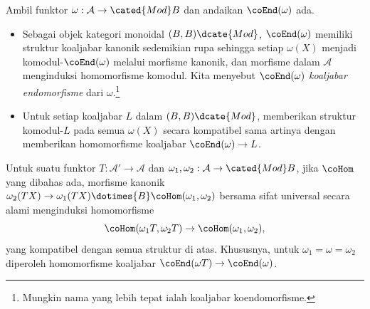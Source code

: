 \begin{definition-proposition}\label{def:cogebra-L}
	Ambil funktor $\omega:\mathcal{A}\to\cated{Mod}B$ dan andaikan
	$\coEnd(\omega)$ ada.
	\begin{itemize}
		\item Sebagai objek kategori monoidal $(B,B)\dcate{Mod}$,
		$\coEnd(\omega)$ memiliki struktur koaljabar kanonik sedemikian rupa
		sehingga setiap $\omega(X)$ menjadi komodul-$\coEnd(\omega)$ melalui
		morfisme kanonik, dan morfisme dalam $\mathcal{A}$ menginduksi
		homomorfisme komodul. Kita menyebut $\coEnd(\omega)$
		\emph{koaljabar endomorfisme} dari $\omega$.\footnote{Mungkin nama
		yang lebih tepat ialah koaljabar koendomorfisme.}
		\item Untuk setiap koaljabar $L$ dalam $(B,B)\dcate{Mod}$,
		memberikan struktur komodul-$L$ pada semua $\omega(X)$ secara
		kompatibel sama artinya dengan memberikan homomorfisme koaljabar
		$\coEnd(\omega)\to L$.
	\end{itemize}
\end{definition-proposition}

\begin{remark}\label{rem:L-cogebra-functoriality}
	Untuk suatu funktor $T:\mathcal{A}'\to\mathcal{A}$ dan
	$\omega_1,\omega_2:\mathcal{A}\to\cated{Mod}B$, jika $\coHom$ yang
	dibahas ada, morfisme kanonik
	$\omega_2(TX)\to\omega_1(TX)\dotimes{B}\coHom(\omega_1,\omega_2)$
	bersama sifat universal secara alami menginduksi homomorfisme
	\[ \coHom(\omega_1 T, \omega_2 T) \to \coHom(\omega_1, \omega_2), \]
	yang kompatibel dengan semua struktur di atas. Khususnya, untuk
	$\omega_1=\omega=\omega_2$ diperoleh homomorfisme koaljabar
	$\coEnd(\omega T)\to\coEnd(\omega)$.
\end{remark}

